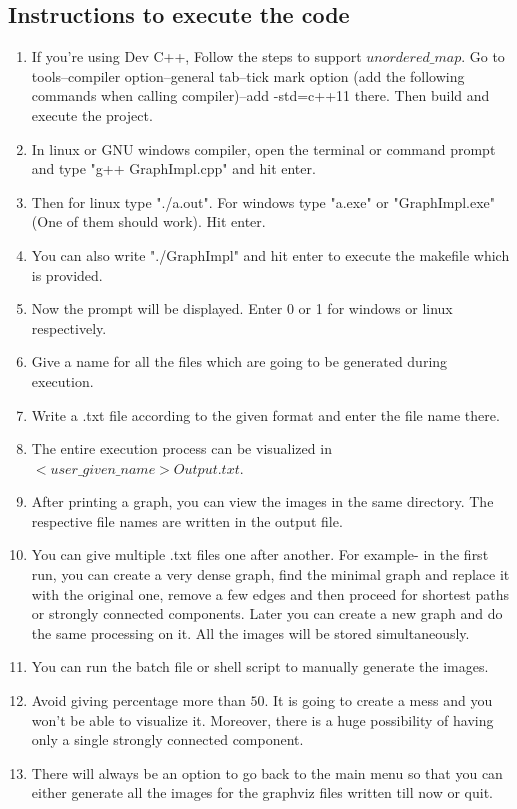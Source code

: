 \documentclass{article}
\begin{document}
\subsection{Instructions to execute the code}
\begin{enumerate}
	\item If you're using Dev C++, Follow the steps to support $unordered\_map$. Go to tools--compiler option--general tab--tick mark option (add the following commands when calling compiler)--add -std=c++11 there. Then build and execute the project.
	\item In linux or GNU windows compiler, open the terminal or command prompt and type "g++ GraphImpl.cpp" and hit enter.
	\item Then for linux type "./a.out". For windows type "a.exe" or "GraphImpl.exe" (One of them should work). Hit enter.
	\item You can also write "./GraphImpl" and hit enter to execute the makefile which is provided.
	\item Now the prompt will be displayed. Enter 0 or 1 for windows or linux respectively.
	\item Give a name for all the files which are going to be generated during execution.
	\item Write a .txt file according to the given format and enter the file name there.
	\item The entire execution process can be visualized in $<user\_given\_name>Output.txt$.
	\item After printing a graph, you can view the images in the same directory. The respective file names are written in the output file.
	\item You can give multiple .txt files one after another. For example- in the first run, you can create a very dense graph, find the minimal graph and replace it with the original one, remove a few edges and then proceed for shortest paths or strongly connected components. Later you can create a new graph and do the same processing on it. All the images will be stored simultaneously.
	\item You can run the batch file or shell script to manually generate the images.
	\item Avoid giving percentage more than $50$. It is going to create a mess and you won't be able to visualize it. Moreover, there is a huge possibility of having only a single strongly connected component.
	\item There will always be an option to go back to the main menu so that you can either generate all the images for the graphviz files written till now or quit.
\end{enumerate}
\end{document}
